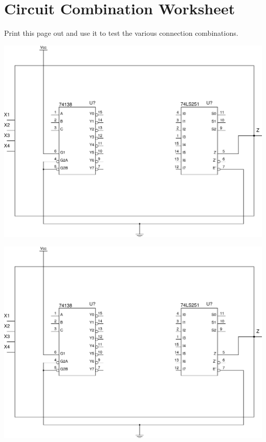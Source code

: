 \documentclass[12pt]{article}
\begin{document}
\appendix

\clearpage
\section{Circuit Combination Worksheet}
\label{sec:wksht}

Print this page out and use it to test the various connection combinations.

\includegraphics[scale=0.5]{lab8-circuit-01}

\includegraphics[scale=0.5]{lab8-circuit-01}
\end{document}
